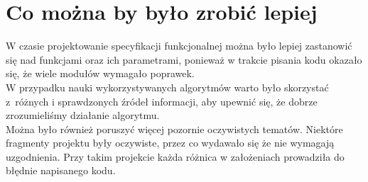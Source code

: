\documentclass[12pt, a4paper]{article}
\begin{document}
\section{Co można by było zrobić lepiej}
W czasie projektowanie specyfikacji funkcjonalnej można było lepiej zastanowić się nad funkcjami oraz ich parametrami, ponieważ w trakcie pisania kodu okazało się, że wiele modułów wymagało poprawek. \\W przypadku nauki wykorzystywanych algorytmów warto było skorzystać z~różnych i sprawdzonych źródeł informacji, aby upewnić się, że dobrze zrozumieliśmy działanie algorytmu. \\Można było również poruszyć więcej pozornie oczywistych tematów. Niektóre fragmenty projektu były oczywiste, przez co wydawało się że nie wymagają uzgodnienia. Przy takim projekcie każda różnica w założeniach prowadziła do błędnie napisanego kodu. 
\end{document}
